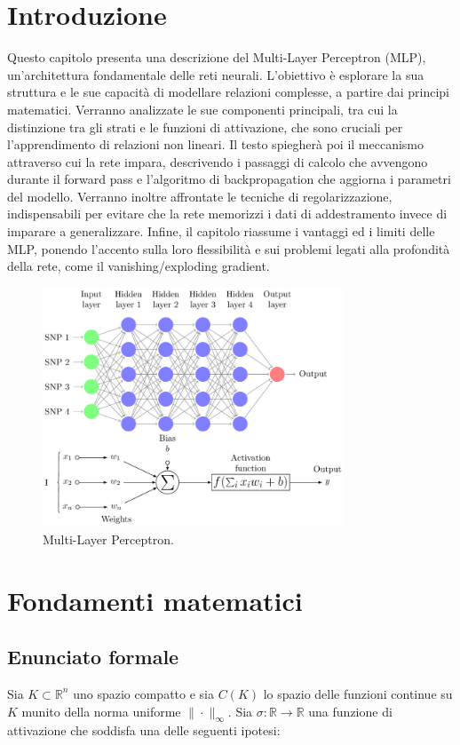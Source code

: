\documentclass[a4paper,12pt]{report}
\begin{document}
	\section{Introduzione}
	Questo capitolo presenta una descrizione del Multi-Layer Perceptron (MLP), un'architettura fondamentale delle reti neurali. L'obiettivo è esplorare la sua struttura e le sue capacità di modellare relazioni complesse, a partire dai principi matematici. Verranno analizzate le sue componenti principali, tra cui la distinzione tra gli strati e le funzioni di attivazione, che sono cruciali per l'apprendimento di relazioni non lineari. Il testo spiegherà poi il meccanismo attraverso cui la rete impara, descrivendo i passaggi di calcolo che avvengono durante il forward pass e l'algoritmo di backpropagation che aggiorna i parametri del modello. Verranno inoltre affrontate le tecniche di regolarizzazione, indispensabili per evitare che la rete memorizzi i dati di addestramento invece di imparare a generalizzare. Infine, il capitolo riassume i vantaggi ed i limiti delle MLP, ponendo l'accento sulla loro flessibilità e sui problemi legati alla profondità della rete, come il vanishing/exploding gradient.
	
	\begin{figure}[H]
		\centering
		\includegraphics[width=0.8\textwidth]{img/mlp.png}
		\caption{Multi-Layer Perceptron.}
	\end{figure}
	
	\section{Fondamenti matematici}
	
	\subsection{Enunciato formale}
	Sia \(K\subset\mathbb{R}^n\) uno spazio compatto e sia \(C(K)\) lo spazio delle funzioni continue su \(K\) munito della norma uniforme \(\|\cdot\|_\infty\). Sia \(\sigma:\mathbb{R}\to\mathbb{R}\) una funzione di attivazione che soddisfa una delle seguenti ipotesi:
	
\end{document}
